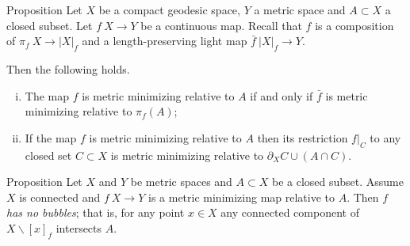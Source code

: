 \documentclass{article}
\begin{document}
\begin{thm}{Proposition}\label{prop:memicrit}
Let $X$ be a compact geodesic space, $Y$ a metric space 
and $A\subset X$ a closed subset.
Let $f\:X\to Y$ be a continuous map.
Recall that 
$f$ is a composition of $\pi_f\: X\to|X|_f$ and a length-preserving light map $\bar f\:|X|_f\to Y$.

Then the following holds.
\begin{enumerate}[(i)]
\item The map $f$ is metric minimizing relative to $A$
if and only if $\bar f$ is metric minimizing relative to $\pi_f(A)$;
\item\label{prop:memicrit:retriction} If the map $f$ is metric minimizing relative to $A$ then its restriction
$f|_C$ to any closed set $C\subset X$ is metric minimizing relative to $\partial_X C\cup (A\cap C)$.
\end{enumerate}

\end{thm}




\begin{thm}{Proposition}\label{prop:point-complement}
Let $X$ and $Y$ be metric spaces and $A\subset X$ be a closed subset.
Assume $X$ is connected and $f\:X\to Y$ is a metric minimizing map relative to $A$.
Then $f$ \label{page:no-bubble}\emph{has no bubbles}; that is, for any point $x\in X$ any connected component of $X\backslash [x]_f$ intersects $A$.

\end{thm}
\end{document}
